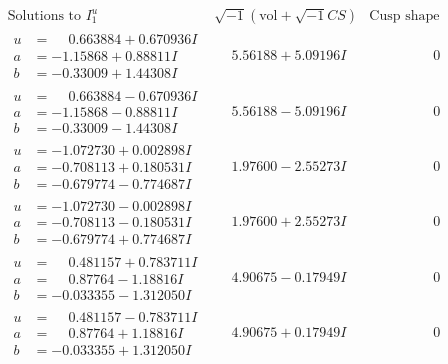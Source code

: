\documentclass[1p]{elsarticle_modified}
\theoremstyle{definition}
\newcommand{\I}{\sqrt{-1}}
\begin{document}
$$\begin{array}{c|c|c}  
\text{Solutions to }I^u_{1}& \I (\text{vol} + \sqrt{-1}CS) & \text{Cusp shape}\\
 \hline 
\begin{aligned}
u &= \phantom{-}0.663884 + 0.670936 I \\
a &= -1.15868 + 0.88811 I \\
b &= -0.33009 + 1.44308 I\end{aligned}
 & \phantom{-}5.56188 + 5.09196 I & \phantom{-0.000000 } 0 \\ \hline\begin{aligned}
u &= \phantom{-}0.663884 - 0.670936 I \\
a &= -1.15868 - 0.88811 I \\
b &= -0.33009 - 1.44308 I\end{aligned}
 & \phantom{-}5.56188 - 5.09196 I & \phantom{-0.000000 } 0 \\ \hline\begin{aligned}
u &= -1.072730 + 0.002898 I \\
a &= -0.708113 + 0.180531 I \\
b &= -0.679774 - 0.774687 I\end{aligned}
 & \phantom{-}1.97600 - 2.55273 I & \phantom{-0.000000 } 0 \\ \hline\begin{aligned}
u &= -1.072730 - 0.002898 I \\
a &= -0.708113 - 0.180531 I \\
b &= -0.679774 + 0.774687 I\end{aligned}
 & \phantom{-}1.97600 + 2.55273 I & \phantom{-0.000000 } 0 \\ \hline\begin{aligned}
u &= \phantom{-}0.481157 + 0.783711 I \\
a &= \phantom{-}0.87764 - 1.18816 I \\
b &= -0.033355 - 1.312050 I\end{aligned}
 & \phantom{-}4.90675 - 0.17949 I & \phantom{-0.000000 } 0 \\ \hline\begin{aligned}
u &= \phantom{-}0.481157 - 0.783711 I \\
a &= \phantom{-}0.87764 + 1.18816 I \\
b &= -0.033355 + 1.312050 I\end{aligned}
 & \phantom{-}4.90675 + 0.17949 I & \phantom{-0.000000 } 0 \\ \hline\begin{aligned}

\end{aligned}
\end{array}$$
\end{document}
